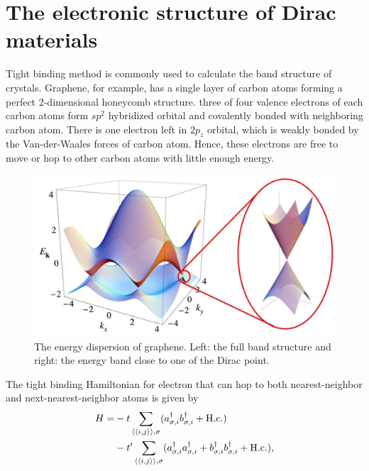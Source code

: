 \section{The electronic structure of Dirac materials}
     Tight binding method is commonly used to calculate the band structure of crystals.
     Graphene, for example, has a single layer of carbon atoms forming a perfect 2-dimensional honeycomb structure.
     three of four valence electrons of each carbon atoms form $sp^2$ hybridized orbital and covalently bonded with neighboring carbon atom.
     There is one electron left in $2p_z$ orbital, which is weakly bonded by the Van-der-Waales forces of carbon atom.
     Hence, these electrons are free to move or hop to other carbon atoms with little enough energy.\\
    \begin{figure}[H]
        \centering
        \includegraphics[width = 0.8\linewidth]{fig/Chap 2/band structure of graphene.png}
        \caption{The energy dispersion of graphene. 
                    Left: the full band structure and right: the energy band close to one of the Dirac point.}
        \label{2fig:band structure of graphene}
    \end{figure}
     The tight binding Hamiltonian for electron that can hop to both nearest-neighbor and next-nearest-neighbor atoms is given by
     \begin{equation} \label{2eq:tight binding Hamiltonian}
         \begin{aligned}
             H = &-t \sum_{\braket{\braket{i,j}},\sigma} (a_{\sigma, i}^{\dagger} b_{\sigma,i}^{\dagger}+ \mathrm{H.c.})\\
                    &-t' \sum_{\braket{\braket{i,j}},\sigma} (a_{\sigma, i}^{\dagger} a_{\sigma,i}^{\dagger}+ b_{\sigma, i}^{\dagger} b_{\sigma,i}^{\dagger} + \mathrm{H.c.}),\\
         \end{aligned}
     \end{equation}
